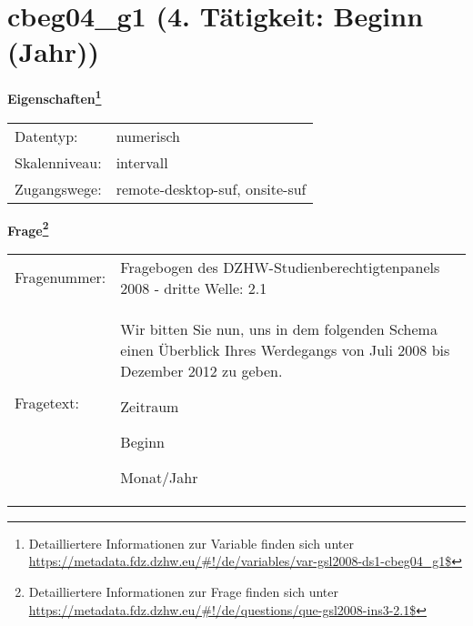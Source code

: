 
    \setcounter{footnote}{0}

    \vspace*{-1.8cm}
	\section{cbeg04\_g1 (4. Tätigkeit: Beginn (Jahr))}
	\label{section:cbeg04_g1}



    \vspace*{0.5cm}
    \noindent\textbf{Eigenschaften\footnote{Detailliertere Informationen zur Variable finden sich unter
		\url{https://metadata.fdz.dzhw.eu/\#!/de/variables/var-gsl2008-ds1-cbeg04_g1$}}}\\
	\begin{tabularx}{\hsize}{@{}lX}
	Datentyp: & numerisch \\
	Skalenniveau: & intervall \\
	Zugangswege: &
	  remote-desktop-suf, 
	  onsite-suf
 \\
    \end{tabularx}



				\vspace*{0.5cm}
                \noindent\textbf{Frage\footnote{Detailliertere Informationen zur Frage finden sich unter
		              \url{https://metadata.fdz.dzhw.eu/\#!/de/questions/que-gsl2008-ins3-2.1$}}}\\
				\begin{tabularx}{\hsize}{@{}lX}
					Fragenummer: &
					  Fragebogen des DZHW-Studienberechtigtenpanels 2008 - dritte Welle:
					  2.1
 \\
					Fragetext: & Wir bitten Sie nun, uns in dem folgenden Schema einen Überblick Ihres Werdegangs von Juli 2008 bis Dezember 2012 zu geben.\par  Zeitraum\par  Beginn\par  Monat/Jahr \\
				\end{tabularx}





